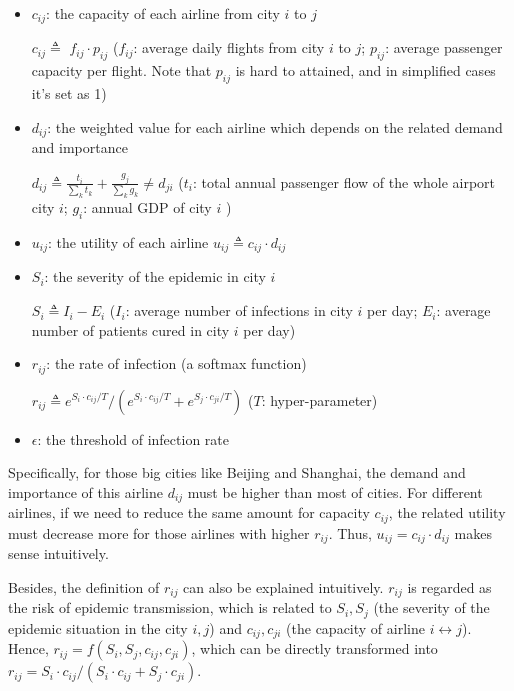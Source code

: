 \begin{itemize}
    \item $c_{ij}$: the capacity of each airline from city $i$ to $j$
    
    $c_{ij} \triangleq$ $f_{ij} \cdot p_{ij}$ ($f_{ij}$: average daily flights from city $i$ to $j$; $p_{ij}$: average passenger capacity per flight. Note that $p_{ij}$ is hard to attained, and in simplified cases it's set as 1)
    
    \item $d_{ij}$: the weighted value for each airline which depends on the related demand and importance
    
    $d_{ij} \triangleq \frac{t_i}{\sum_k t_k} + \frac{g_j}{\sum_k g_k} \neq d_{ji} $ ($t_i$: total annual passenger flow of the whole airport city $i$; $g_i$: annual GDP of city $i$ ) %
    
    \item $u_{ij}$: the utility of each airline
    $u_{ij} \triangleq c_{ij} \cdot d_{ij}$
    
    \item $S_i$: the severity of the epidemic in city $i$
    
    $S_i \triangleq I_i - E_i$ ($I_i$: average number of infections in city $i$ per day; $E_i$: average number of patients cured in city $i$ per day)
    
    \item $r_{ij}$: the rate of infection (a softmax function)
    
    $r_{ij} \triangleq e^{S_i \cdot c_{ij} / T} / (e^{S_i \cdot c_{ij} / T} + e^{S_j \cdot c_{ji} / T})$ ($T$: hyper-parameter)
    
    \item $\epsilon$: the threshold of infection rate
\end{itemize}

Specifically, for those big cities like Beijing and Shanghai, the demand and importance of this airline $d_{ij}$ must be higher than most of cities. For different airlines, if we need to reduce the same amount for capacity $c_{ij}$, the related utility must decrease more for those airlines with higher $r_{ij}$. Thus, $u_{ij} = c_{ij} \cdot d_{ij}$ makes sense intuitively. 

Besides, the definition of $r_{ij}$ can also be explained intuitively. $r_{ij}$ is regarded as the risk of epidemic transmission, which is related to $S_i,S_j$ (the severity of the epidemic situation in the city $i,j$) and $c_{ij},c_{ji}$ (the capacity of airline $i \leftrightarrow j$). Hence, $r_{ij} = f(S_i, S_j, c_{ij}, c_{ji})$, which can be directly transformed into $r_{ij} = S_i \cdot c_{ij} / (S_i \cdot c_{ij} + S_j \cdot c_{ji})$.

